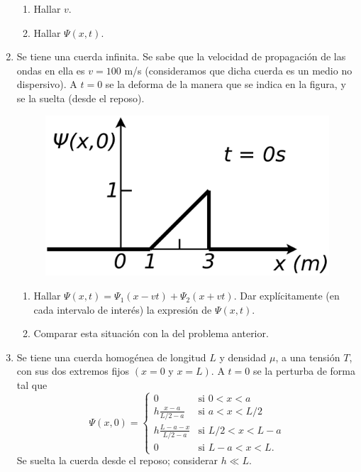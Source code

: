 \documentclass[11pt,spanish,a4paper]{article}
\begin{document}
\begin{enumerate}
\begin{enumerate}
\item Hallar $v$.
\item Hallar $\Psi(x,t)$.
\end{enumerate}
\item Se tiene una cuerda infinita. Se sabe que la velocidad de propagación
de las ondas en ella es $v=100$ m/s (consideramos que dicha cuerda
es un medio no dispersivo). A $t=0$ se la deforma de la manera que
se indica en la figura, y se la suelta (desde el reposo).
\begin{figure}[H]
\centering{}\includegraphics[clip,scale=0.25]{ej2-3}
\end{figure}


\begin{enumerate}
\item Hallar $\Psi(x,t)=\Psi_{1}(x-vt)+\Psi_{2}(x+vt)$. Dar explícitamente
(en cada intervalo de interés) la expresión de $\Psi(x,t)$.
\item Comparar esta situación con la del problema anterior.
\end{enumerate}
\item Se tiene una cuerda homogénea de longitud $L$ y densidad $\mu$,
a una tensión $T$, con sus dos extremos fijos $(x=0\mbox{ y }x=L)$.
A $t=0$ se la perturba de forma tal que
\[
\Psi(x,0)=\begin{cases}
0 & \mbox{si }0<x<a\\
h\frac{x-a}{L/2-a} & \mbox{si }a<x<L/2\\
h\frac{L-a-x}{L/2-a} & \mbox{si }L/2<x<L-a\\
0 & \mbox{si }L-a<x<L.
\end{cases}
\]
Se suelta la cuerda desde el reposo; considerar $h\ll L$.


\end{enumerate}
\end{document}
